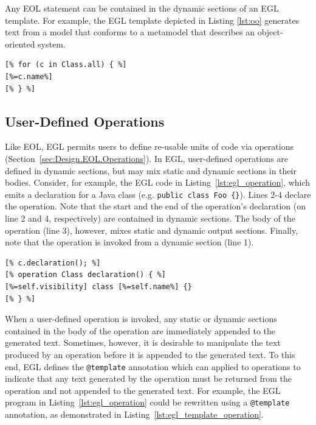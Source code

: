 Any EOL statement can be contained in the dynamic sections of an EGL template.
For example, the EGL template depicted in Listing \ref{lst:oo} generates text
from a model that conforms to a metamodel that describes an
object-oriented system. %

\begin{lstlisting}[basicstyle=\ttfamily\footnotesize, language=EGL, tabsize=2, flexiblecolumns=true, caption=Generating the name of each Class contained in an input model., label=lst:oo]
[% for (c in Class.all) { %]
[%=c.name%]
[% } %]
\end{lstlisting}

\subsection{User-Defined Operations}
Like EOL, EGL permits users to define re-usable units of code via operations (Section~\ref{sec:Design.EOL.Operations}). In EGL, user-defined operations  
are defined in dynamic sections, but may mix static and dynamic sections in their
bodies. Consider, for example, the EGL code in Listing~\ref{lst:egl_operation}, 
which emits a declaration for a Java class (e.g. \texttt{public class Foo \{\}}).
Lines 2-4 declare the operation. Note that the start and the end of the operation's 
declaration (on line 2 and 4, respectively) are contained in dynamic sections. The
body of the operation (line 3), however, mixes static and dynamic output sections.
Finally, note that the operation is invoked from a dynamic section (line 1).

\begin{lstlisting}[basicstyle=\ttfamily\footnotesize, language=EGL, tabsize=2, flexiblecolumns=true, caption=Using an operation to specify the text generated for a declaration of a Java class., label=lst:egl_operation]
[% c.declaration(); %]
[% operation Class declaration() { %]
[%=self.visibility] class [%=self.name%] {}
[% } %]
\end{lstlisting}

When a user-defined operation is invoked, any static or dynamic sections contained 
in the body of the operation are immediately appended to the generated text. Sometimes, 
however, it is desirable to manipulate the text produced by an operation before it is
appended to the generated text. To this end, EGL defines the \texttt{@template} annotation
which can applied to operations to indicate that any text generated by the operation
must be returned from the operation and not appended to the generated text. For example,
the EGL program in Listing~\ref{lst:egl_operation} could be rewritten using a \texttt{@template}
annotation, as demonstrated in Listing~\ref{lst:egl_template_operation}.


